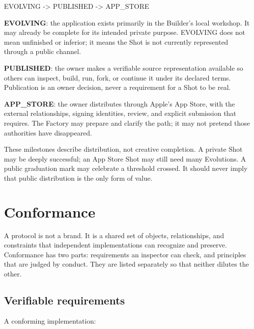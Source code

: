 \documentclass[11pt]{article}
\begin{document}
\begin{proto}
EVOLVING -> PUBLISHED -> APP_STORE
\end{proto}

\textbf{EVOLVING}: the application exists primarily in the Builder's
local workshop. It may already be complete for its intended private
purpose. EVOLVING does not mean unfinished or inferior; it means the
Shot is not currently represented through a public channel.

\textbf{PUBLISHED}: the owner makes a verifiable source representation
available so others can inspect, build, run, fork, or continue it under
its declared terms. Publication is an owner decision, never a
requirement for a Shot to be real.

\textbf{APP\_STORE}: the owner distributes through Apple's App Store,
with the external relationships, signing identities, review, and
explicit submission that requires. The Factory may prepare and clarify
the path; it may not pretend those authorities have disappeared.

These milestones describe distribution, not creative completion. A
private Shot may be deeply successful; an App Store Shot may still need
many Evolutions. A public graduation mark may celebrate a threshold
crossed. It should never imply that public distribution is the only form
of value.

\section{Conformance}

A protocol is not a brand. It is a shared set of objects, relationships,
and constraints that independent implementations can recognize and
preserve. Conformance has two parts: requirements an inspector can
check, and principles that are judged by conduct. They are listed
separately so that neither dilutes the other.

\subsection{Verifiable requirements}

A conforming implementation:
\end{document}

